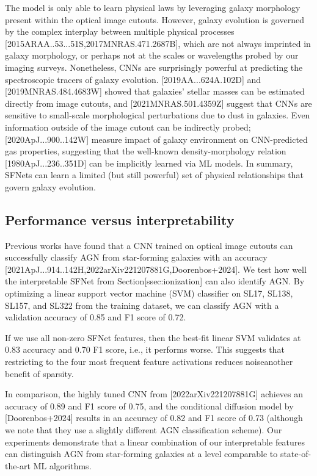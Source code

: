 \documentclass[11pt,a4paper]{article}
\begin{document}
The model is only able to learn physical laws by leveraging galaxy morphology present within the optical image cutouts. However, galaxy evolution is governed by the complex interplay between multiple physical processes [2015ARAA..53...51S,2017MNRAS.471.2687B], which are not always imprinted in galaxy morphology, or perhaps not at the scales or wavelengths probed by our imaging surveys. Nonetheless, CNNs are surprisingly powerful at predicting the spectroscopic tracers of galaxy evolution. [2019AA...624A.102D] and [2019MNRAS.484.4683W] showed that galaxies' stellar masses can be estimated directly from image cutouts, and [2021MNRAS.501.4359Z] suggest that CNNs are sensitive to small-scale morphological perturbations due to dust in galaxies. Even information outside of the image cutout can be indirectly probed; [2020ApJ...900..142W] measure impact of galaxy environment on CNN-predicted gas properties, suggesting that the well-known density-morphology relation [1980ApJ...236..351D] can be implicitly learned via ML models.
In summary, SFNets can learn a limited (but still powerful) set of physical relationships that govern galaxy evolution.

\subsection{Performance versus interpretability}

Previous works have found that a CNN trained on optical image cutouts can successfully classify AGN from star-forming galaxies with an accuracy [2021ApJ...914..142H,2022arXiv221207881G,Doorenbos+2024]. We test how well the interpretable SFNet from Section[ssec:ionization] can also identify AGN. By optimizing a linear support vector machine (SVM) classifier on SL17, SL138, SL157, and SL322 from the training dataset, we can classify AGN with a validation accuracy of 0.85 and F1 score of 0.72.

If we use all non-zero SFNet features, then the best-fit linear SVM validates at 0.83 accuracy and 0.70 F1 score, i.e., it performs worse. This suggests that restricting to the four most frequent feature activations reduces noiseanother benefit of sparsity.

In comparison, the highly tuned CNN from [2022arXiv221207881G] achieves an accuracy of 0.89 and F1 score of 0.75, and the conditional diffusion model by  [Doorenbos+2024] results in an accuracy of 0.82 and F1 score of 0.73 (although we note that they use a slightly different AGN classification scheme). Our experiments demonstrate that a linear combination of our interpretable features can distinguish AGN from star-forming galaxies at a level comparable to state-of-the-art ML algorithms.
\end{document}
